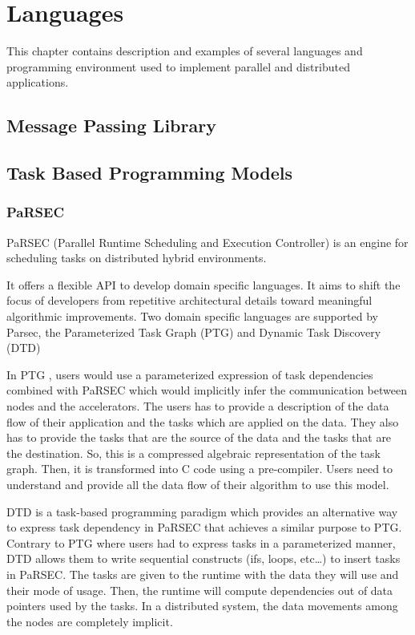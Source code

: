 \chapter{Languages}
\label{chap:languages}
\graphicspath{{chapters/languages/}}



This chapter contains description and examples of several languages and programming environment used to implement parallel and distributed applications.

\section{Message Passing Library}

\section{Task Based Programming Models}
\subsection{PaRSEC}
PaRSEC \cite{BBDHL2011} \cite{BBDFH2013} (Parallel Runtime Scheduling and Execution Controller) is an engine for scheduling tasks on distributed hybrid environments.

It offers a flexible API to develop domain specific languages.
It aims to shift the focus of developers from repetitive architectural details toward meaningful algorithmic improvements.
Two domain specific languages are supported by Parsec, the Parameterized Task Graph \cite{DBBHD2014} (PTG) and Dynamic Task Discovery \cite{HoHBD2017} (DTD)

In PTG \cite{DBBHD2014}, users would use a parameterized expression of task dependencies combined with PaRSEC which would implicitly infer the communication between nodes and the accelerators.
The users has to provide a description of the data flow of their application and the tasks which are applied on the data.
They also has to provide the tasks that are the source of the data and the tasks that are the destination.
So, this is a compressed algebraic representation of the task graph.
Then, it is transformed into C code using a pre-compiler.
Users need to understand and provide all the data flow of their algorithm to use this model.


DTD \cite{HoHBD2017} is a task-based programming paradigm which provides an alternative way to express task dependency in PaRSEC that achieves a similar purpose to PTG.
Contrary to PTG where users had to express tasks in a parameterized manner, DTD allows them to write sequential constructs (ifs, loops, etc\dots) to insert tasks in PaRSEC.
The tasks are given to the runtime with the data they will use and their mode of usage.
Then, the runtime will compute dependencies out of data pointers used by the tasks.
In a distributed system, the data movements among the nodes are completely implicit.


